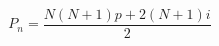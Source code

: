 \documentclass[preview]{standalone}
\begin{document}
\begin{align*}
P_n = \dfrac{N(N+1)p+2(N+1)i}2
\end{align*}
\end{document}
